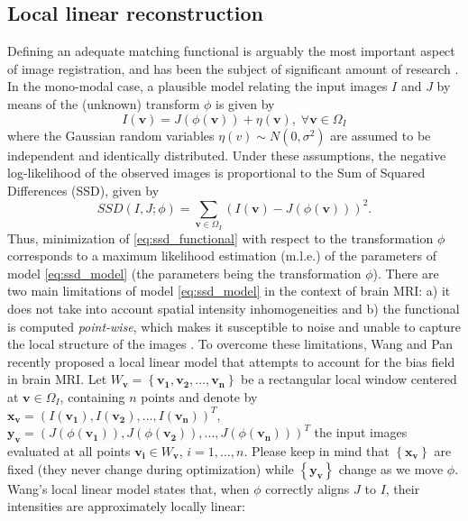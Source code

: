 \subsection{Local linear reconstruction}
Defining an adequate matching functional is arguably the most important aspect of image registration, and has been the subject of significant amount of research \cite{Sotiras2013}. In the mono-modal case, a plausible model relating the input images $I$ and $J$ by means of the (unknown) transform $\phi$ is given by
\begin{equation}\label{eq:ssd_model}
    I(\mathbf{v}) = J(\phi(\mathbf{v})) + \eta(\mathbf{v}), \; \forall \mathbf{v} \in\Omega_{I}
\end{equation}
where the Gaussian random variables $\eta(v) \sim N(0, \sigma^{2})$ are assumed to be independent and identically distributed. Under these assumptions, the negative log-likelihood of the observed images is proportional to the Sum of Squared Differences (SSD), given by
\begin{equation}\label{eq:ssd_functional}
    SSD(I, J; \phi) = \sum_{\mathbf{v} \in \Omega_{I}} \left(I(\mathbf{v}) - J(\phi(\mathbf{v}))\right)^{2}.
\end{equation}
Thus, minimization of \eqref{eq:ssd_functional} with respect to the transformation $\phi$ corresponds to a maximum likelihood estimation (m.l.e.) of the parameters of model \eqref{eq:ssd_model} (the parameters being the transformation $\phi$). There are two main limitations of model \eqref{eq:ssd_model} in the context of brain MRI: a) it does not take into account spatial intensity inhomogeneities and b) the functional is computed \emph{point-wise}, which makes it susceptible to noise and unable to capture the local structure of the images \cite{Heinrich2012}. To overcome these limitations, Wang and Pan \cite{Wang2014} recently proposed a local linear model that attempts to account for the bias field in brain MRI. Let $W_{\mathbf{v}} = \left\lbrace \mathbf{v_{1}}, \mathbf{v_{2}}, ..., \mathbf{v_{n}} \right\rbrace$ be a rectangular local window centered at $\mathbf{v} \in\Omega_{I}$, containing $n$ points and denote by $\mathbf{x}_{\mathbf{v}} = (I(\mathbf{v_{1}}), I(\mathbf{v_{2}}), ..., I(\mathbf{v_{n}}))^{T}$, $\mathbf{y}_{\mathbf{v}} = (J(\phi(\mathbf{v_{1}})), J(\phi(\mathbf{v_{2}})), ..., J(\phi(\mathbf{v_{n}})))^{T}$ the input images evaluated at all points $\mathbf{v_{i}}\in W_{\mathbf{v}}$, $i=1, ..., n$. Please keep in mind that $\left\lbrace\mathbf{x}_{\mathbf{v}}\right\rbrace$ are fixed (they never change during optimization) while $\left\lbrace\mathbf{y}_{\mathbf{v}}\right\rbrace$ change as we move $\phi$. Wang's local linear model states that, when $\phi$ correctly aligns $J$ to $I$, their intensities are approximately locally linear:
